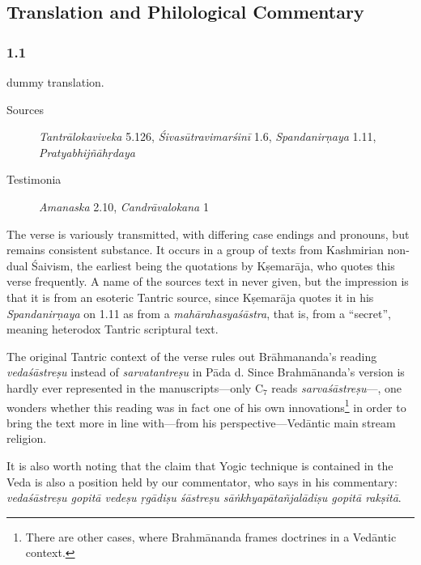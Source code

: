 \pagestyle{HPed} %
\begin{ekdosis}

  \chapter{Translation and Philological Commentary}

  \subsection*{1.1}
  \begin{translation}[hp01_001]
    dummy translation.
  \end{translation}

  \begin{philcomm}[hp01_001]
    \begin{description}
      \item[Sources]{\emph{Tantrālokaviveka} 5.126, \emph{Śivasūtravimarśinī} 1.6, \emph{Spandanirṇaya} 1.11, \emph{Pratyabhijñāhṛdaya}}
      \item[Testimonia]{\emph{Amanaska} 2.10, \emph{Candrāvalokana} 1}
    \end{description}  

    \noindent
    The verse is variously transmitted, with differing case endings and pronouns, but remains
    consistent substance. It occurs in a group of texts from Kashmirian non-dual Śaivism, the earliest
    being the quotations by Kṣemarāja, who quotes this verse frequently. A name of the sources text in
    never given, but the impression is that it is from an esoteric Tantric source, since Kṣemarāja
    quotes it in his \emph{Spandanirṇaya} on 1.11 as from a \emph{mahārahasyaśāstra}, that is, from a
    ``secret'', meaning heterodox Tantric scriptural text.

    The original Tantric context of the verse rules out Brāhmananda's reading \emph{vedaśāstreṣu}
    instead of \emph{sarvatantreṣu} in Pāda d. Since Brahmānanda's version is hardly ever represented
    in the manuscripts—only C$_{7}$ reads \emph{sarvaśāstreṣu}—, one wonders whether this reading was
    in fact one of his own innovations\footnote{There are other cases, where Brahmānanda frames
      doctrines in a Vedāntic context.}  in order to bring the text more in line with—from his
    perspective—Vedāntic main stream religion.

    It is also worth noting that the claim that Yogic technique is contained in the Veda is also a
    position held by our commentator, who says in his commentary: \emph{vedaśāstreṣu gopitā vedeṣu
      ṛgādiṣu śāstreṣu sāṅkhyapātañjalādiṣu gopitā rakṣitā}. 


\end{philcomm}
\end{ekdosis}
